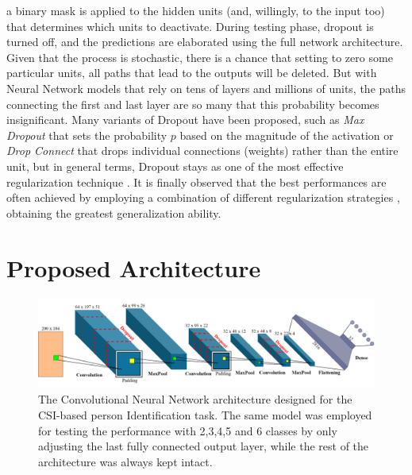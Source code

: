 \documentclass[binding=0.7cm, oneside]{sapthesis}
\begin{document}
a binary mask is applied to the hidden units (and, willingly, to the input too) that determines which units to deactivate. During testing phase, dropout is turned off, and the predictions are elaborated using
the full network architecture. Given that the process is stochastic, there is a chance that setting to zero some particular units, all paths that lead to the outputs will be deleted. But with Neural Network models that rely on
tens of layers and millions of units, the paths connecting the first and last layer are so many that this probability becomes insignificant. Many variants of Dropout have been proposed, such as \emph{Max Dropout} that sets the
probability $p$ based on the magnitude of the activation or \emph{Drop Connect} that drops individual connections (weights) rather than the entire unit, but in general terms, Dropout stays as one of the most effective regularization
technique \cite{regular_comparison}. It is finally observed that the best performances are often achieved by employing a combination of different regularization strategies \cite{regular_combining,survey_regular}, obtaining the greatest generalization ability.

\section{Proposed Architecture}
\begin{figure}[h]
    \centering
    \includegraphics[width=\textwidth]{images/cnn.png}
    \caption{The Convolutional Neural Network architecture designed for the CSI-based person Identification task.
        The same model was employed for testing the performance with 2,3,4,5 and 6 classes by only adjusting the last fully connected output layer, while the rest
        of the architecture was always kept intact.}
    \label{fig:model}
\end{figure}



\end{document}
